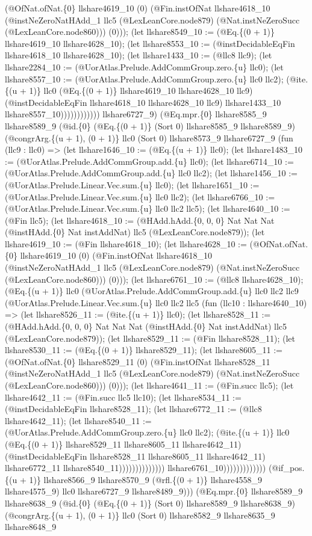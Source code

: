 \documentclass[11pt]{article}
\begin{document}
(@OfNat.ofNat.\{0\} llshare4619\_10 (0) (@Fin.instOfNat llshare4618\_10 (@instNeZeroNatHAdd\_1 llc5 (@LexLeanCore.node879) (@Nat.instNeZeroSucc (@LexLeanCore.node860))) (0))); (let llshare8549\_10 := (@Eq.\{(0 + 1)\} llshare4619\_10 llshare4628\_10); (let llshare8553\_10 := (@instDecidableEqFin llshare4618\_10 llshare4628\_10); (let llshare1433\_10 := (@llc8 llc9); (let llshare2284\_10 := (@UorAtlas.Prelude.AddCommGroup.zero.\{u\} llc0); (let llshare8557\_10 := (@UorAtlas.Prelude.AddCommGroup.zero.\{u\} llc0 llc2); (@ite.\{(u + 1)\} llc0 (@Eq.\{(0 + 1)\} llshare4619\_10 llshare4628\_10 llc9) (@instDecidableEqFin llshare4618\_10 llshare4628\_10 llc9) llshare1433\_10 llshare8557\_10)))))))))))) llshare6727\_9) (@Eq.mpr.\{0\} llshare8585\_9 llshare8589\_9 (@id.\{0\} (@Eq.\{(0 + 1)\} (Sort 0) llshare8585\_9 llshare8589\_9) (@congrArg.\{(u + 1), (0 + 1)\} llc0 (Sort 0) llshare8573\_9 llshare6727\_9 (fun (llc9 : llc0) => (let llshare1646\_10 := (@Eq.\{(u + 1)\} llc0); (let llshare1483\_10 := (@UorAtlas.Prelude.AddCommGroup.add.\{u\} llc0); (let llshare6714\_10 := (@UorAtlas.Prelude.AddCommGroup.add.\{u\} llc0 llc2); (let llshare1456\_10 := (@UorAtlas.Prelude.Linear.Vec.sum.\{u\} llc0); (let llshare1651\_10 := (@UorAtlas.Prelude.Linear.Vec.sum.\{u\} llc0 llc2); (let llshare6766\_10 := (@UorAtlas.Prelude.Linear.Vec.sum.\{u\} llc0 llc2 llc5); (let llshare4640\_10 := (@Fin llc5); (let llshare4618\_10 := (@HAdd.hAdd.\{0, 0, 0\} Nat Nat Nat (@instHAdd.\{0\} Nat instAddNat) llc5 (@LexLeanCore.node879)); (let llshare4619\_10 := (@Fin llshare4618\_10); (let llshare4628\_10 := (@OfNat.ofNat.\{0\} llshare4619\_10 (0) (@Fin.instOfNat llshare4618\_10 (@instNeZeroNatHAdd\_1 llc5 (@LexLeanCore.node879) (@Nat.instNeZeroSucc (@LexLeanCore.node860))) (0))); (let llshare6761\_10 := (@llc8 llshare4628\_10); (@Eq.\{(u + 1)\} llc0 (@UorAtlas.Prelude.AddCommGroup.add.\{u\} llc0 llc2 llc9 (@UorAtlas.Prelude.Linear.Vec.sum.\{u\} llc0 llc2 llc5 (fun (llc10 : llshare4640\_10) => (let llshare8526\_11 := (@ite.\{(u + 1)\} llc0); (let llshare8528\_11 := (@HAdd.hAdd.\{0, 0, 0\} Nat Nat Nat (@instHAdd.\{0\} Nat instAddNat) llc5 (@LexLeanCore.node879)); (let llshare8529\_11 := (@Fin llshare8528\_11); (let llshare8530\_11 := (@Eq.\{(0 + 1)\} llshare8529\_11); (let llshare8605\_11 := (@OfNat.ofNat.\{0\} llshare8529\_11 (0) (@Fin.instOfNat llshare8528\_11 (@instNeZeroNatHAdd\_1 llc5 (@LexLeanCore.node879) (@Nat.instNeZeroSucc (@LexLeanCore.node860))) (0))); (let llshare4641\_11 := (@Fin.succ llc5); (let llshare4642\_11 := (@Fin.succ llc5 llc10); (let llshare8534\_11 := (@instDecidableEqFin llshare8528\_11); (let llshare6772\_11 := (@llc8 llshare4642\_11); (let llshare8540\_11 := (@UorAtlas.Prelude.AddCommGroup.zero.\{u\} llc0 llc2); (@ite.\{(u + 1)\} llc0 (@Eq.\{(0 + 1)\} llshare8529\_11 llshare8605\_11 llshare4642\_11) (@instDecidableEqFin llshare8528\_11 llshare8605\_11 llshare4642\_11) llshare6772\_11 llshare8540\_11)))))))))))))) llshare6761\_10))))))))))))) (@if\_pos.\{(u + 1)\} llshare8566\_9 llshare8570\_9 (@rfl.\{(0 + 1)\} llshare4558\_9 llshare4575\_9) llc0 llshare6727\_9 llshare8489\_9))) (@Eq.mpr.\{0\} llshare8589\_9 llshare8638\_9 (@id.\{0\} (@Eq.\{(0 + 1)\} (Sort 0) llshare8589\_9 llshare8638\_9) (@congrArg.\{(u + 1), (0 + 1)\} llc0 (Sort 0) llshare8582\_9 llshare8635\_9 llshare8648\_9 
\end{document}
